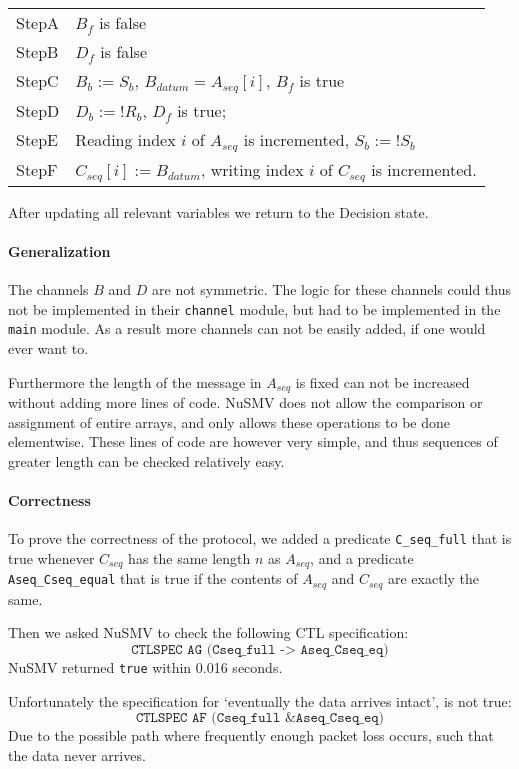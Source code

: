 \documentclass[12pt]{article}
\begin{document}
\begin{center}
\begin{tabular}{|l|p{12cm}|}
\hline
StepA & $B_f$ is false\\
StepB & $D_f$ is false\\
StepC & $B_b := S_b$, $B_{datum} = A_{seq}[i]$, $B_f$ is true\\
StepD & $D_b := !R_b$, $D_f$ is true; \\
StepE & Reading index $i$ of $A_{seq}$ is incremented, $S_b := !S_b$\\
StepF & $C_{seq}[i] := B_{datum}$, writing index $i$ of $C_{seq}$ is incremented.\\
\hline
\end{tabular}
\end{center}
After updating all relevant variables we return to the Decision state.

\paragraph{Generalization}
The channels $B$ and $D$ are not symmetric.
The logic for these channels could thus not be implemented in their \texttt{channel} module, but had to be implemented in the \texttt{main} module.
As a result more channels can not be easily added, if one would ever want to.

Furthermore the length of the message in $A_{seq}$ is fixed can not be increased without adding more lines of code.
NuSMV does not allow the comparison or assignment of entire arrays, and only allows these operations to be done elementwise.
These lines of code are however very simple, and thus sequences of greater length can be checked relatively easy.

\paragraph{Correctness}
To prove the correctness of the protocol, 
we added a predicate \texttt{C\_seq\_full} that is true 
whenever $C_{seq}$ has the same length $n$ as $A_{seq}$, 
and a predicate \texttt{Aseq\_Cseq\_equal} that is true 
if the contents of $A_{seq}$ and $C_{seq}$ are exactly the same.

Then we asked NuSMV to check the following CTL specification:
\[ \texttt{CTLSPEC AG (Cseq\_full -> Aseq\_Cseq\_eq)} \]
NuSMV returned \texttt{true} within 0.016 seconds.

Unfortunately the specification for `eventually the data arrives intact', is not true:
\[ \texttt{CTLSPEC AF (Cseq\_full \& Aseq\_Cseq\_eq)} \]
Due to the possible path where frequently enough packet loss occurs, such that the data never arrives.
\end{document}

